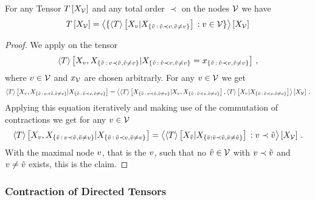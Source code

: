 \begin{theorem}\label{the:genericChainRule}
	For any Tensor $T\left[X_{\mathcal{V}}\right]$ and any total order $\prec$ on the nodes $\mathcal{V}$ we have %
	\begin{align*}
		T\left[X_{\mathcal{V}}\right] =
		\left\langle 
			\{ \left\langle T\right\rangle \left[ X_{v} | X_{\{\tilde{v} \, : \, \tilde{v} \prec v, \tilde{v}\neq v\}} \right]  \, : v\in\mathcal{V} \}
		\right\rangle \left[ X_{\mathcal{V}} \right]
	\end{align*}
\end{theorem}
\begin{proof}
	We apply  on the tensor
	\begin{align*}
		\left\langle T\right\rangle \left[ 
			X_{v},X_{\{\tilde{v} \, : \, v \prec \tilde{v}, \tilde{v}\neq v\}}
		 | 
			X_{\{\tilde{v} \, : \, \tilde{v} \prec v, \tilde{v}\neq v\}}=x_{\{\tilde{v} \, : \, \tilde{v} \prec v, \tilde{v}\neq v\}}
		 \right] \, ,
	\end{align*}
	where $v\in\mathcal{V}$ and $x_{\mathcal{V}}$ are chosen arbitrarly.
	For any $v\in\mathcal{V}$ we get
	\begin{align*}
		\left\langle T\right\rangle \left[ 
			X_{v},X_{\{\tilde{v} \, : \, v \prec \tilde{v}, \tilde{v}\neq v\}}
			 | 
			X_{\{\tilde{v} \, : \, \tilde{v} \prec v, \tilde{v}\neq v\}}
		 \right]
		= \left\langle 
			\left\langle T\right\rangle \left[ 
				X_{\{\tilde{v} \, : \, v \prec \tilde{v}, \tilde{v}\neq v\}}
				 | 
				X_{v},X_{\{\tilde{v} \, : \, \tilde{v} \prec v, \tilde{v}\neq v\}}
				 \right],
			\left\langle T\right\rangle \left[ 
				X_{v}
				 | 
				X_{\{\tilde{v} \, : \, \tilde{v} \prec v, \tilde{v}\neq v\}}
				 \right]
		\right\rangle \left[ 
			X_{\mathcal{V}}
		 \right] \, .
	\end{align*}
	Applying this equation iteratively and making use of the commutation of contractions we get for any $v\in\mathcal{V}$
	\begin{align*}
		\left\langle T\right\rangle \left[ 
			X_{v},X_{\{\tilde{v} \, : \, v \prec \tilde{v}, \tilde{v}\neq v\}}
		 | 
			X_{\{\tilde{v} \, : \, \tilde{v} \prec v, \tilde{v}\neq v\}}
		 \right]
		= \left\langle 
			\left\langle T\right\rangle \left[ 
				X_{\tilde{v}}
			 | 
				X_{\{\bar{v} : \bar{v} \prec \tilde{v}, \bar{v}\neq\tilde{v}\}}
			 \right]
			\, : v \prec \tilde{v}
		\right\rangle \left[ 
			X_{\mathcal{V}}
		 \right] \, .
	\end{align*}
	With the maximal node $v$, that is the $v$, such that no $\tilde{v}\in\mathcal{V}$ with $v\prec\tilde{v}$ and $v\neq\tilde{v}$ exists, this is the claim.
\end{proof}


\subsubsection{Contraction of Directed Tensors}


